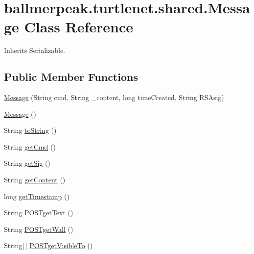\hypertarget{classballmerpeak_1_1turtlenet_1_1shared_1_1Message}{\section{ballmerpeak.\-turtlenet.\-shared.\-Message Class Reference}
\label{classballmerpeak_1_1turtlenet_1_1shared_1_1Message}
}


Inherits Serializable.

\subsection*{Public Member Functions}
\begin{DoxyCompactItemize}
\item 
\hyperlink{classballmerpeak_1_1turtlenet_1_1shared_1_1Message_a041662ab689ade1ea19f62e5cd817ca9}{Message} (String cmd, String \-\_\-content, long time\-Created, String R\-S\-Asig)
\item 
\hyperlink{classballmerpeak_1_1turtlenet_1_1shared_1_1Message_a720cfd084900bae0da46d2d7cc00cc05}{Message} ()
\item 
String \hyperlink{classballmerpeak_1_1turtlenet_1_1shared_1_1Message_aa8740ff71efab8c679bbe843ddb2ece6}{to\-String} ()
\item 
String \hyperlink{classballmerpeak_1_1turtlenet_1_1shared_1_1Message_ab325933a58271b3dfb2248fb0aa5f04a}{get\-Cmd} ()
\item 
String \hyperlink{classballmerpeak_1_1turtlenet_1_1shared_1_1Message_ae53793a87f824fad0a57bdf3ca99b8b2}{get\-Sig} ()
\item 
String \hyperlink{classballmerpeak_1_1turtlenet_1_1shared_1_1Message_af04d03a5ccc6fbf47401869f70202076}{get\-Content} ()
\item 
long \hyperlink{classballmerpeak_1_1turtlenet_1_1shared_1_1Message_a9f05d89ed28e6aff33af41879f867389}{get\-Timestamp} ()
\item 
String \hyperlink{classballmerpeak_1_1turtlenet_1_1shared_1_1Message_a713627f93aca228a3d54e3b7a98fc62c}{P\-O\-S\-Tget\-Text} ()
\item 
String \hyperlink{classballmerpeak_1_1turtlenet_1_1shared_1_1Message_ab1bea6fac3dffdecca7cce5470f7dbf4}{P\-O\-S\-Tget\-Wall} ()
\item 
String\mbox{[}$\,$\mbox{]} \hyperlink{classballmerpeak_1_1turtlenet_1_1shared_1_1Message_a44cac992a0e0a0e71f4467a538faf953}{P\-O\-S\-Tget\-Visible\-To} ()
\item 

\end{DoxyCompactItemize}

